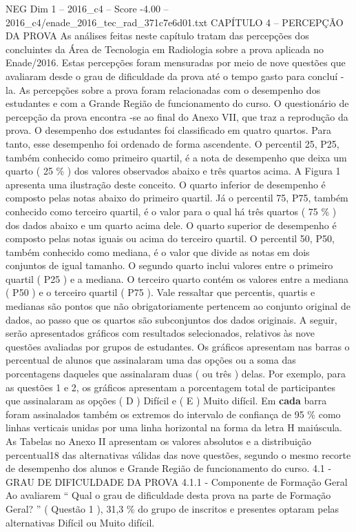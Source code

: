 \begin{textsample}{NEG Dim 1 – 2016\_c4 – Score -4.00 – 2016\_c4/enade\_2016\_tec\_rad\_371c7e6d01.txt}  \label{ex:f1_neg_153}
CAPÍTULO 4 – PERCEPÇÃO DA PROVA As análises feitas neste capítulo tratam das percepções dos concluintes da Área de Tecnologia em Radiologia sobre a prova aplicada no Enade/2016.
Estas percepções foram mensuradas por meio de nove questões que avaliaram desde o grau de dificuldade da prova até o tempo gasto para concluí -la.
As percepções sobre a prova foram relacionadas com o desempenho dos estudantes e com a Grande Região de funcionamento do curso.
O questionário de percepção da prova encontra -se ao final do Anexo VII, que traz a reprodução da prova.
O desempenho dos estudantes foi classificado em quatro quartos.
Para tanto, esse desempenho foi ordenado de forma ascendente.
O percentil 25, P25, também conhecido como primeiro quartil, é a nota de desempenho que deixa um quarto ( 25 \% ) dos valores observados abaixo e três quartos acima.
A Figura 1 apresenta uma ilustração deste conceito.
O quarto inferior de desempenho é composto pelas notas abaixo do primeiro quartil.
Já o percentil 75, P75, também conhecido como terceiro quartil, é o valor para o qual há três quartos ( 75 \% ) dos dados abaixo e um quarto acima dele.
O quarto superior de desempenho é composto pelas notas iguais ou acima do terceiro quartil.
O percentil 50, P50, também conhecido como mediana, é o valor que divide as notas em dois conjuntos de igual tamanho.
O segundo quarto inclui valores entre o primeiro quartil ( P25 ) e a mediana.
O terceiro quarto contém os valores entre a mediana ( P50 ) e o terceiro quartil ( P75 ).
Vale ressaltar que percentis, quartis e medianas são pontos que não obrigatoriamente pertencem ao conjunto original de dados, ao passo que os quartos são subconjuntos dos dados originais.
A seguir, serão apresentados gráficos com resultados selecionados, relativos às nove questões avaliadas por grupos de estudantes.
Os gráficos apresentam nas barras o percentual de alunos que assinalaram uma das opções ou a soma das porcentagens daqueles que assinalaram duas ( ou três ) delas.
Por exemplo, para as questões 1 e 2, os gráficos apresentam a porcentagem total de participantes que assinalaram as opções ( D ) Difícil e ( E ) Muito difícil.
Em \textbf{cada} barra foram assinalados também os extremos do intervalo de confiança de 95 \% como linhas verticais unidas por uma linha horizontal na forma da letra H maiúscula.
As Tabelas no Anexo II apresentam os valores absolutos e a distribuição percentual18 das alternativas válidas das nove questões, segundo o mesmo recorte de desempenho dos alunos e Grande Região de funcionamento do curso. 4.1 - GRAU DE DIFICULDADE DA PROVA 4.1.1 - Componente de Formação Geral Ao avaliarem “ Qual o grau de dificuldade desta prova na parte de Formação Geral? ” ( Questão 1 ), 31,3 \% do grupo de inscritos e presentes optaram pelas alternativas Difícil ou Muito difícil.

\end{textsample}
